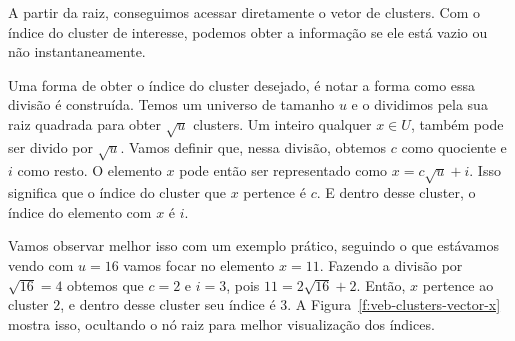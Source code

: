 A partir da raiz, conseguimos acessar diretamente o vetor de clusters. Com o
índice do cluster de interesse, podemos obter a informação se ele está vazio ou
não instantaneamente.

Uma forma de obter o índice do cluster desejado, é notar a forma como essa
divisão é construída. Temos um universo de tamanho $u$ e o dividimos pela sua
raiz quadrada para obter $\sqrt{u}$ clusters. Um inteiro qualquer $x \in U$,
também pode ser divido por $\sqrt{u}$. Vamos definir que, nessa divisão, obtemos
$c$ como quociente e $i$ como resto. O elemento $x$ pode então ser representado
como $x=c\sqrt{u}+i$. Isso significa que o índice do cluster que $x$ pertence é
$c$. E dentro desse cluster, o índice do elemento com $x$ é $i$. 

Vamos observar melhor isso com um exemplo prático, seguindo o que estávamos
vendo com $u=16$ vamos focar no elemento $x=11$. Fazendo a divisão por
$\sqrt{16}=4$ obtemos que $c=2$ e $i=3$, pois $11=2\sqrt{16}+2$. Então, $x$
pertence ao cluster $2$, e dentro desse cluster seu índice é $3$. A
Figura~\ref{f:veb-clusters-vector-x} mostra isso, ocultando o nó raiz para
melhor visualização dos índices.

